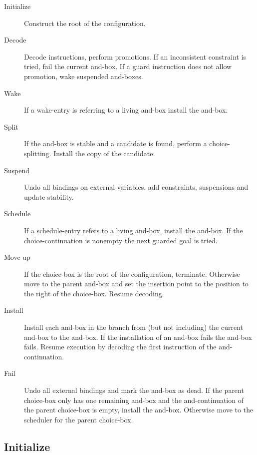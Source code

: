 \begin{description}

\item[Initialize] Construct the root of the configuration.

\item[Decode] Decode instructions, perform promotions. If an inconsistent 
constraint is tried, fail the current and-box. If a guard instruction
does not allow promotion, wake suspended and-boxes.

\item[Wake] If a wake-entry is referring to a living and-box install the 
and-box.

\item[Split] If the and-box is stable and a candidate is found, perform
a choice-splitting. Install the copy of the candidate.

\item[Suspend] Undo all bindings on external variables, add constraints, 
suspensions and update stability.

\item[Schedule] If a schedule-entry refers to a living and-box, 
install the and-box. If the choice-continuation is nonempty the next
guarded goal is tried.

\item[Move up] If the choice-box is the root of the configuration,
terminate. Otherwise move to the parent and-box and set the insertion
point to the position to the right of the choice-box. Resume decoding.

\item[Install] Install each and-box in the branch from (but not including) the 
current and-box to the and-box. If the installation of an and-box
fails the and-box fails. Resume execution by decoding the first
instruction of the and-continuation.

\item[Fail] Undo all external bindings and mark the and-box as dead. 
If the parent choice-box only has one remaining and-box and the
and-continuation of the parent choice-box is empty, install the and-box.
Otherwise move to the scheduler for the parent choice-box.

\end{description}



\subsection*{Initialize}

